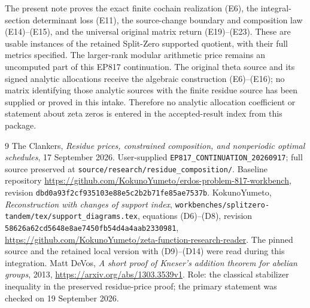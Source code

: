 \documentclass[11pt]{article}
\begin{document}
The present note proves the exact finite cochain realization (E6),
the integral-section determinant loss (E11), the source-change
boundary and composition law (E14)--(E15), and the universal original
matrix return (E19)--(E23).  These are usable instances of the retained
Split-Zero supported quotient, with their full metrics specified.
The larger-rank modular arithmetic price remains an uncomputed part
of this EP817 continuation.  The original theta source and its signed
analytic allocations receive the algebraic construction (E6)--(E16);
no matrix identifying those analytic sources with the finite residue
source has been supplied or proved in this intake.  Therefore no
analytic allocation coefficient or statement about zeta zeros is
entered in the accepted-result index from this package.

\begin{thebibliography}{9}
The Clankers, \emph{Residue prices, constrained composition, and nonperiodic
optimal schedules}, 17 September 2026.  User-supplied
\texttt{EP817\_CONTINUATION\_20260917}; full source preserved at
\texttt{source/research/residue\_composition/}.
Baseline repository
\url{https://github.com/KokunoYumeto/erdos-problem-817-workbench},
revision \texttt{dbd0a93f2cf935103e88e5c2b2b71fe85ae7537b}.
KokunoYumeto, \emph{Reconstruction with changes of support index},
\texttt{workbenches/splitzero-tandem/tex/support\_diagrams.tex},
equations (D6)--(D8), revision
\texttt{58626a62cd5648e8ae7450fb54d4a4aab2330981},
\url{https://github.com/KokunoYumeto/zeta-function-research-reader}.
The pinned source and the retained local version with (D9)--(D14) were
read during this integration.
Matt DeVos, \emph{A short proof of Kneser's addition theorem for abelian
groups}, 2013, \url{https://arxiv.org/abs/1303.3539v1}.
Role: the classical stabilizer inequality in the preserved residue-price
proof; the primary statement was checked on 19 September 2026.
\end{thebibliography}
\end{document}
